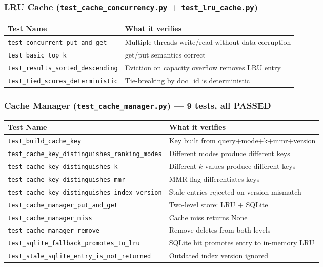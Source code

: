 \documentclass[12pt]{article}
\begin{document}
\subsubsection*{LRU Cache (\texttt{test\_cache\_concurrency.py} + \texttt{test\_lru\_cache.py})}
\begin{table}[H]
\centering
\footnotesize
\begin{tabular}{|p{7cm}|p{7.5cm}|}
\hline
\textbf{Test Name} & \textbf{What it verifies} \\
\hline
\texttt{test\_concurrent\_put\_and\_get}        & Multiple threads write/read without data corruption \\
\texttt{test\_basic\_top\_k}                    & get/put semantics correct \\
\texttt{test\_results\_sorted\_descending}      & Eviction on capacity overflow removes LRU entry \\
\texttt{test\_tied\_scores\_deterministic}      & Tie-breaking by doc\_id is deterministic \\
\hline
\end{tabular}
\end{table}

\subsubsection*{Cache Manager (\texttt{test\_cache\_manager.py}) --- 9 tests, all PASSED}
\begin{table}[H]
\centering
\footnotesize
\begin{tabular}{|p{7cm}|p{7.5cm}|}
\hline
\textbf{Test Name} & \textbf{What it verifies} \\
\hline
\texttt{test\_build\_cache\_key}                       & Key built from query+mode+k+mmr+version \\
\texttt{test\_cache\_key\_distinguishes\_ranking\_modes} & Different modes produce different keys \\
\texttt{test\_cache\_key\_distinguishes\_k}            & Different $k$ values produce different keys \\
\texttt{test\_cache\_key\_distinguishes\_mmr}          & MMR flag differentiates keys \\
\texttt{test\_cache\_key\_distinguishes\_index\_version} & Stale entries rejected on version mismatch \\
\texttt{test\_cache\_manager\_put\_and\_get}           & Two-level store: LRU $+$ SQLite \\
\texttt{test\_cache\_manager\_miss}                    & Cache miss returns None \\
\texttt{test\_cache\_manager\_remove}                  & Remove deletes from both levels \\
\texttt{test\_sqlite\_fallback\_promotes\_to\_lru}     & SQLite hit promotes entry to in-memory LRU \\
\texttt{test\_stale\_sqlite\_entry\_is\_not\_returned} & Outdated index version ignored \\
\hline
\end{tabular}
\end{table}
\end{document}
